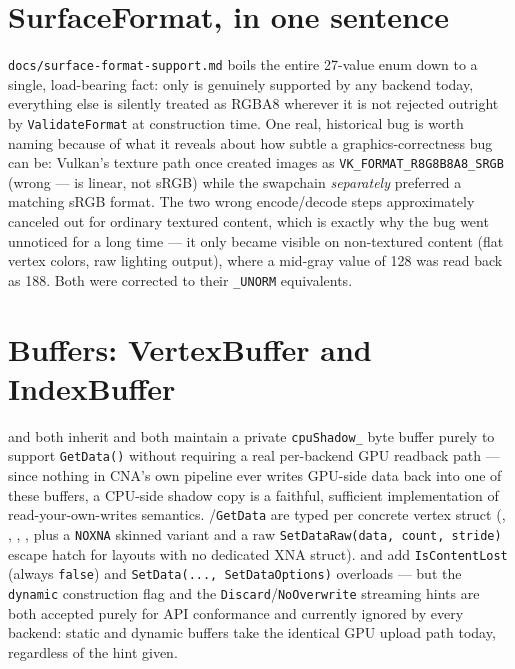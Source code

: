 \section{SurfaceFormat, in one sentence}

\texttt{docs/surface-format-support.md} boils the entire 27-value 
enum down to a single, load-bearing fact: only  is genuinely
supported by any backend today, everything else is silently treated as RGBA8 wherever it is
not rejected outright by \texttt{ValidateFormat} at construction time. One real, historical
bug is worth naming because of what it reveals about how subtle a graphics-correctness bug
can be: Vulkan's texture path once created images as \texttt{VK\_FORMAT\_R8G8B8A8\_SRGB}
(wrong ---  is linear, not sRGB) while the swapchain
\emph{separately} preferred a matching sRGB format. The two wrong encode/decode steps
approximately canceled out for ordinary textured content, which is exactly why the bug went
unnoticed for a long time --- it only became visible on non-textured content (flat vertex
colors, raw lighting output), where a mid-gray value of 128 was read back as 188. Both were
corrected to their \texttt{\_UNORM} equivalents.

\section{Buffers: VertexBuffer and IndexBuffer}

 and  both inherit 
and both maintain a private \texttt{cpuShadow\_} byte buffer purely to support
\texttt{GetData()} without requiring a real per-backend GPU readback path --- since nothing
in CNA's own pipeline ever writes GPU-side data back into one of these buffers, a CPU-side
shadow copy is a faithful, sufficient implementation of read-your-own-writes semantics.
/\texttt{GetData} are typed per concrete vertex struct
(, ,
, , plus a
\texttt{NOXNA} skinned variant and a raw \texttt{SetDataRaw(data, count, stride)} escape hatch
for layouts with no dedicated XNA struct).  and
 add \texttt{IsContentLost} (always \texttt{false}) and
\texttt{SetData(..., SetDataOptions)} overloads --- but the \texttt{dynamic} construction flag
and the \texttt{Discard}/\texttt{NoOverwrite} streaming hints are both accepted purely for API
conformance and currently ignored by every backend: static and dynamic buffers take the
identical GPU upload path today, regardless of the hint given.

